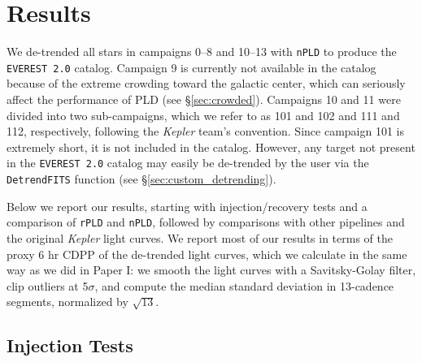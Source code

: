 \documentclass[]{emulateapj}
\newcommand{\edited}[1]{{\color{red} #1}}
\begin{document}
\section{Results}
\label{sec:results}
\edited{We de-trended all stars in campaigns 0--8 and 10--13 with \texttt{nPLD} to produce the
\texttt{EVEREST 2.0} catalog. Campaign 9 is currently not available in the catalog
because of the extreme crowding toward the galactic center, which can seriously affect
the performance of PLD (see \S\ref{sec:crowded}). Campaigns 10 and 11 were divided into
two sub-campaigns, which we refer to as 101 and 102 and 111 and 112, respectively, following
the \emph{Kepler} team's convention. Since campaign 101 is extremely short, it is
not included in the catalog. However, any target not present in the \texttt{EVEREST 2.0}
catalog may easily be de-trended by the user via the \texttt{DetrendFITS} function
(see \S\ref{sec:custom_detrending}).}

Below we report our results, starting with
injection/recovery tests and a comparison of \texttt{rPLD} and \texttt{nPLD},
followed by comparisons with other pipelines and the original \emph{Kepler}
light curves. We report most of our results in terms of the proxy 6 hr CDPP of
the de-trended light curves, which we calculate in the same way as we did
in Paper I: we smooth the light curves with a Savitsky-Golay filter, clip
outliers at 5$\sigma$, and compute the median standard deviation in 13-cadence
segments, normalized by $\sqrt{13}$.

\subsection{Injection Tests}
\label{sec:inj}
\end{document}
